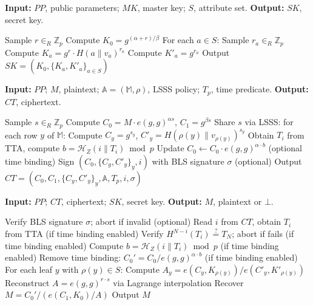 \documentclass[lettersize,journal]{IEEEtran}
\begin{document}
\begin{algorithm}[H]
\caption{KeyGen($PP, MK, S$)}
\textbf{Input:} $PP$, public parameters; $MK$, master key; $S$, attribute set. \textbf{Output:} $SK$, secret key.\;
\begin{algorithmic}[1]
\STATE Sample $r \in_R \mathbb{Z}_p$
\STATE Compute $K_0 = g^{(\alpha+r)/\beta}$
\STATE For each $a \in S$:
    \STATE \quad Sample $r_a \in_R \mathbb{Z}_p$
    \STATE \quad Compute $K_a = g^r \cdot H(a \| v_a)^{r_a}$
    \STATE \quad Compute $K'_a = g^{r_a}$
\STATE Output $SK = (K_0, \{K_a, K'_a\}_{a \in S})$
\end{algorithmic}
\label{alg:keygen_supp}
\end{algorithm}

\begin{algorithm}[H]
\caption{Encrypt($PP, M, \mathbb{A}, T_p$)}
\textbf{Input:} $PP$; $M$, plaintext; $\mathbb{A}=( \mathbb{M}, \rho)$, LSSS policy; $T_p$, time predicate. \textbf{Output:} $CT$, ciphertext.\;
\begin{algorithmic}[1]
\STATE Sample $s \in_R \mathbb{Z}_p$
\STATE Compute $C_0 = M \cdot e(g,g)^{\alpha s}$, $C_1 = g^{\beta s}$
\STATE Share $s$ via LSSS: for each row $y$ of $\mathbb{M}$:
    \STATE \quad Compute $C_y = g^{s_y}$, $C'_y = H(\rho(y) \| v_{\rho(y)})^{s_y}$
\STATE Obtain $T_i$ from TTA, compute $b = \mathcal{H}_Z(i \| T_i) \bmod p$
\STATE Update $C_0 \leftarrow C_0 \cdot e(g,g)^{\alpha \cdot b}$ (optional time binding)
\STATE Sign $(C_0, \{C_y, C'_y\}_y, i)$ with BLS signature $\sigma$ (optional)
\STATE Output $CT = (C_0, C_1, \{C_y, C'_y\}_y, \mathbb{A}, T_p, i, \sigma)$
\end{algorithmic}
\label{alg:encrypt_supp}
\end{algorithm}

\begin{algorithm}[H]
\caption{Decrypt($PP, CT, SK$)}
\textbf{Input:} $PP$; $CT$, ciphertext; $SK$, secret key. \textbf{Output:} $M$, plaintext or $\bot$.\;
\begin{algorithmic}[1]
\STATE Verify BLS signature $\sigma$; abort if invalid (optional)
\STATE Read $i$ from $CT$, obtain $T_i$ from TTA (if time binding enabled)
\STATE Verify $H^{N-i}(T_i) \stackrel{?}{=} T_N$; abort if fails (if time binding enabled)
\STATE Compute $b = \mathcal{H}_Z(i \| T_i) \bmod p$ (if time binding enabled)
\STATE Remove time binding: $C_0' = C_0 / e(g,g)^{\alpha \cdot b}$ (if time binding enabled)
\STATE For each leaf $y$ with $\rho(y) \in S$:
    \STATE \quad Compute $A_y = e(C_y, K_{\rho(y)}) / e(C'_y, K'_{\rho(y)})$
\STATE Reconstruct $A = e(g,g)^{r \cdot s}$ via Lagrange interpolation
\STATE Recover $M = C_0' / (e(C_1, K_0) / A)$
\STATE Output $M$
\end{algorithmic}
\label{alg:decrypt_supp}
\end{algorithm}
\end{document}
